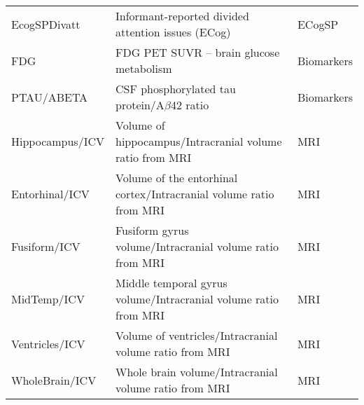 \begin{table}[H]
\begin{adjustbox}{max width=\textwidth}
\begin{tabularx}{\textwidth}{>{\raggedright\arraybackslash}p{3cm} >{\raggedright\arraybackslash}X >{\raggedright\arraybackslash}p{3cm}}
			EcogSPDivatt          & Informant-reported divided attention issues (ECog)                                 & ECogSP                \\
			FDG                   & FDG PET SUVR – brain glucose metabolism                                            & Biomarkers            \\
			PTAU/ABETA            & CSF phosphorylated tau protein/A$\beta$42 ratio                                     & Biomarkers            \\
			Hippocampus/ICV       & Volume of hippocampus/Intracranial volume ratio from MRI                           & MRI                   \\
			Entorhinal/ICV        & Volume of the entorhinal cortex/Intracranial volume ratio from MRI                 & MRI                   \\
			Fusiform/ICV          & Fusiform gyrus volume/Intracranial volume ratio from MRI                           & MRI                   \\
			MidTemp/ICV           & Middle temporal gyrus volume/Intracranial volume ratio from MRI                    & MRI                   \\
			Ventricles/ICV        & Volume of ventricles/Intracranial volume ratio from MRI                            & MRI                   \\
			WholeBrain/ICV        & Whole brain volume/Intracranial volume ratio from MRI                              & MRI                   \\
			\bottomrule
		\end{tabularx}
	\end{adjustbox}
\end{table}

\newpage